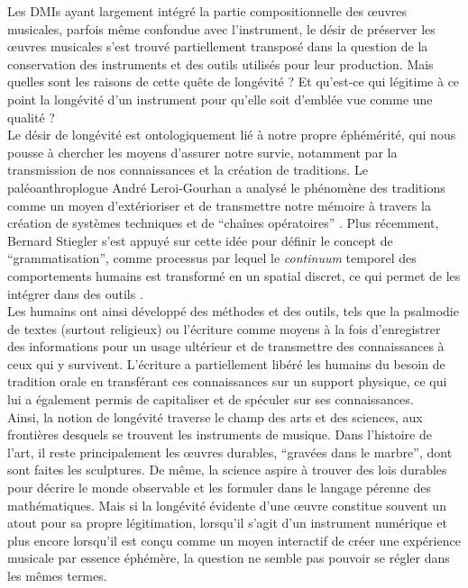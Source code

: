 \indent Les \glspl{DMI} ayant largement intégré la partie compositionnelle des œuvres musicales, parfois même confondue avec l'instrument, le désir de préserver les œuvres musicales s'est trouvé partiellement transposé dans la question de la conservation des instruments et des outils utilisés pour leur production. Mais quelles sont les raisons de cette quête de longévité ? Et qu’est-ce qui légitime à ce point la longévité d’un instrument pour qu’elle soit d’emblée vue comme une qualité ?\\
\indent Le désir de longévité est ontologiquement lié à notre propre éphémérité, qui nous pousse à chercher les moyens d'assurer notre survie, notamment par la transmission de nos connaissances et la création de traditions. Le paléoanthroplogue André Leroi-Gourhan a analysé le phénomène des traditions comme un moyen d'extérioriser et de transmettre notre mémoire à travers la création de systèmes techniques et de ``chaînes opératoires'' \cite{leroi-gourhan_geste_1964}. Plus récemment, Bernard Stiegler s'est appuyé sur cette idée pour définir le concept de ``grammatisation'', comme processus par lequel le \textit{continuum} temporel des comportements humains est transformé en un spatial discret, ce qui permet de les intégrer dans des outils \cite{stiegler_for_2010}.\\
\indent Les humains ont ainsi développé des méthodes et des outils, tels que la psalmodie de textes (surtout religieux) ou l'écriture comme moyens à la fois d'enregistrer des informations pour un usage ultérieur et de transmettre des connaissances à ceux qui y survivent. L'écriture a partiellement libéré les humains du besoin de tradition orale en transférant ces connaissances sur un support physique, ce qui lui a également permis de capitaliser et de spéculer sur ses connaissances.\\
\indent Ainsi, la notion de longévité traverse le champ des arts et des sciences, aux frontières desquels se trouvent les instruments de musique. Dans l'histoire de l'art, il reste principalement les œuvres durables, ``gravées dans le marbre'', dont sont faites les sculptures. De même, la science aspire à trouver des lois durables pour décrire le monde observable et les formuler dans le langage pérenne des mathématiques. Mais si la longévité évidente d'une œuvre constitue souvent un atout pour sa propre légitimation, lorsqu'il s'agit d'un instrument numérique et plus encore lorsqu'il est conçu comme un moyen interactif de créer une expérience musicale par essence éphémère, la question ne semble pas pouvoir se régler dans les mêmes termes.\\

